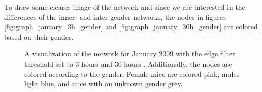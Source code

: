 To draw some clearer image of the network and since we are interested in the differences of the inner- and inter-gender networks, the nodes in figures \ref{fig:graph_january_3h_gender} and \ref{fig:graph_january_30h_gender} are colored based on their gender.

\begin{figure}[htpb]%
	\centering 
	\qquad 
			
	\caption[Network visualizations with different edge filter values]{A visualization of the network for January 2009 with the edge filter threshold set to 3 hours  and 30 hours . Additionally, the nodes are colored according to the gender. Female mice are colored pink, males light blue, and mice with an unknown gender grey.} 
	 
\end{figure}

